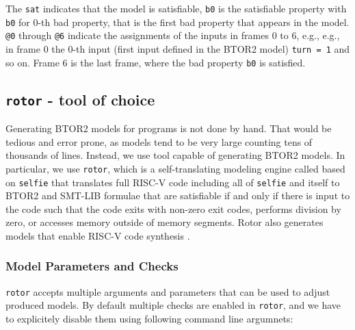 \documentclass[12pt]{article}
\begin{document}
The \texttt{sat} indicates that the model is satisfiable, \texttt{b0} is the 
satisfiable property with \texttt{b0} for 0-th bad property, that is the first
bad property that appears in the model. \texttt{@0} through \texttt{@6}
indicate the assignments of the inputs in frames 0 to 6, e.g., e.g., in frame
0 the 0-th input (first input defined in the BTOR2 model) \texttt{turn = 1} and
so on. Frame 6 is the last frame, where the bad property \texttt{b0} is
satisfied.

\subsection{\texttt{rotor} - tool of choice}

Generating BTOR2 models for programs is not done by hand. That would be tedious
and error prone, as models tend to be very large counting tens of thousands of
lines. Instead, we use tool capable of generating BTOR2 models. In particular,
we use \texttt{rotor}, which is a self-translating modeling
engine called based on \texttt{selfie} that translates full RISC-V code
including all of \texttt{selfie} and itself to BTOR2 and SMT-LIB formulae that
are satisfiable if and only if there is input to the code such that the code
exits with non-zero exit codes, performs division by zero, or accesses memory
outside of memory segments. Rotor also generates models that enable RISC-V code
synthesis \cite{gh:rotor}.

\subsubsection{Model Parameters and Checks}

\texttt{rotor} accepts multiple arguments and parameters that can be used to
adjust produced models. By default multiple checks are enabled in
\texttt{rotor}, and we have to explicitely disable them using following command
line argumnets:
\end{document}
